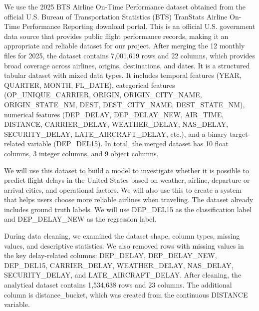 We use the 2025 BTS Airline On-Time Performance dataset obtained from the official U.S. Bureau of Transportation Statistics (BTS) TranStats Airline On-Time Performance Reporting download portal. This is an official U.S. government data source that provides public flight performance records, making it an appropriate and reliable dataset for our project. After merging the 12 monthly files for 2025, the dataset contains 7,001,619 rows and 22 columns, which provides broad coverage across airlines, origins, destinations, and dates. It is a structured tabular dataset with mixed data types. It includes temporal features (YEAR, QUARTER, MONTH, FL\_DATE), categorical features (OP\_UNIQUE\_CARRIER, ORIGIN, ORIGIN\_CITY\_NAME, ORIGIN\_STATE\_NM, DEST, DEST\_CITY\_NAME, DEST\_STATE\_NM), numerical features (DEP\_DELAY, DEP\_DELAY\_NEW, AIR\_TIME, DISTANCE, CARRIER\_DELAY, WEATHER\_DELAY, NAS\_DELAY, SECURITY\_DELAY, LATE\_AIRCRAFT\_DELAY, etc.), and a binary target-related variable (DEP\_DEL15). In total, the merged dataset has 10 float columns, 3 integer columns, and 9 object columns. 

We will use this dataset to build a model to investigate whether it is possible to predict flight delays in the United States based on weather, airline, departure or arrival cities, and operational factors. We will also use this to create a system that helps users choose more reliable airlines when traveling. The dataset already includes ground truth labels. We will use DEP\_DEL15 as the classification label and DEP\_DELAY\_NEW as the regression label.

During data cleaning, we examined the dataset shape, column types, missing values, and descriptive statistics. We also removed rows with missing values in the key delay-related columns: DEP\_DELAY, DEP\_DELAY\_NEW, DEP\_DEL15, CARRIER\_DELAY, WEATHER\_DELAY, NAS\_DELAY, SECURITY\_DELAY, and LATE\_AIRCRAFT\_DELAY. After cleaning, the analytical dataset contains 1,534,638 rows and 23 columns. The additional column is distance\_bucket, which was created from the continuous DISTANCE variable.

